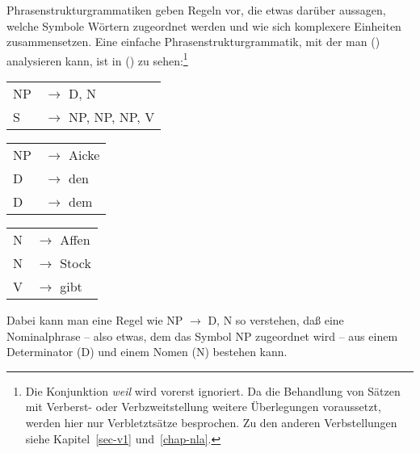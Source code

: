Phrasenstrukturgrammatiken geben Regeln vor, die etwas darüber aussagen, welche Symbole Wörtern
zugeordnet werden und wie sich komplexere Einheiten zusammensetzen. Eine einfache Phrasenstrukturgrammatik,
mit der man () analysieren kann, ist in () zu sehen:\footnote{
  Die Konjunktion \emph{weil} wird vorerst ignoriert. Da die Behandlung von Sätzen mit Verberst- oder
  Verbzweitstellung weitere Überlegungen voraussetzt, werden hier nur Verbletztsätze besprochen.
  Zu den anderen Verbstellungen siehe Kapitel~\ref{sec-v1} und~\ref{chap-nla}.%
}
\ea
\label{bsp-grammatik-psg}
\begin{tabular}[t]{@{}l@{ }l}
{NP} & {$\to$ D, N}\\          
{S}  & {$\to$ NP, NP, NP, V}
\end{tabular}\hspace{2cm}%
\begin{tabular}[t]{@{}l@{ }l}
{NP} & {$\to$ Aicke}\\
{D}  & {$\to$ den}\\
{D}  & {$\to$ dem}\\
\end{tabular}\hspace{8mm}
\begin{tabular}[t]{@{}l@{ }l}
{N} & {$\to$ Affen}\\
{N} & {$\to$ Stock}\\
{V} & {$\to$ gibt}\\
\end{tabular}
\z
Dabei kann man eine Regel wie NP $\to$\is{$\to$} D, N so verstehen, daß eine Nominalphrase -- also etwas,
dem das Symbol NP zugeordnet wird -- aus einem Determinator (D) und einem Nomen (N) bestehen kann.

